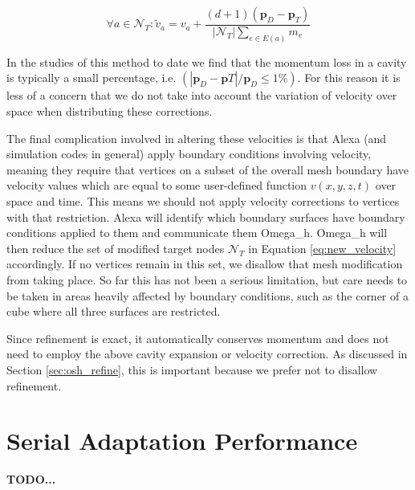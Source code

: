\begin{equation} \label{eq:new_velocity}
\forall a \in \mathcal{N}_T:
\tilde{v}_a = v_a +
\frac{{(d+1)}(\mathbf{p}_D - \mathbf{p}_T)}{|\mathcal{N}_T|\sum_{e\in E(a)}m_e}
\end{equation}

In the studies of this method to date we find that the momentum
loss in a cavity is typically a small percentage, i.e.
$(|\mathbf{p}_D - \mathbf{p}T|/\mathbf{p}_D \leq 1\%)$.
For this reason it is less of a concern that we do not take into
account the variation of velocity over space when distributing
these corrections.

The final complication involved in altering these velocities
is that Alexa (and simulation codes in general) apply boundary
conditions involving velocity, meaning they require that vertices
on a subset of the overall mesh boundary have velocity values
which are equal to some user-defined function $v(x,y,z,t)$
over space and time.
This means we should not apply velocity corrections to vertices
with that restriction.
Alexa will identify which boundary surfaces have boundary
conditions applied to them and communicate them Omega\_h.
Omega\_h will then reduce the set
of modified target nodes $\mathcal{N}_T$ in Equation \ref{eq:new_velocity}
accordingly.
If no vertices remain in this set, we disallow that mesh
modification from taking place.
So far this has not been a serious limitation, but care needs to
be taken in areas heavily affected by boundary conditions,
such as the corner of a cube where all three surfaces are
restricted.

Since refinement is exact, it automatically conserves momentum
and does not need to employ the above cavity expansion or velocity
correction.
As discussed in Section \ref{sec:osh_refine}, this is important
because we prefer not to disallow refinement.

\section{Serial Adaptation Performance}

{\bf TODO... }



